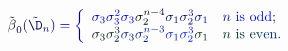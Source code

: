 \documentclass[12pt]{article}
\begin{document}
\makeatletter
\renewcommand*{\@textcolor}[3]{%
  \protect\leavevmode
  \begingroup
    \color#1{#2}#3%
  \endgroup
}
\makeatother
\begin{displaymath}
{\mathcolor[RGB]{0,0,15}{\tilde { \mathcolor[RGB]{0,0,30}{\beta} } }} _ { \mathcolor[RGB]{0,0,45}{0} } \mathcolor[RGB]{0,0,60}{(} {\mathcolor[RGB]{0,0,75}{\tilde { \mathcolor[RGB]{0,0,90}{\D} } }} _ { \mathcolor[RGB]{0,0,105}{n} } \mathcolor[RGB]{0,0,120}{)} \mathcolor[RGB]{0,0,135}{=} \mathcolor[RGB]{0,0,150}{\left\{} \begin{array} {ll} { \mathcolor[RGB]{0,0,165}{\sigma} _ { \mathcolor[RGB]{0,0,180}{3} } \mathcolor[RGB]{0,0,195}{\sigma} _ { \mathcolor[RGB]{0,0,210}{3} } ^ { \mathcolor[RGB]{0,0,225}{2} } \mathcolor[RGB]{0,0,240}{\sigma} _ { \mathcolor[RGB]{0,0,255}{3} } \mathcolor[RGB]{0,15,0}{\sigma} _ { \mathcolor[RGB]{0,15,15}{2} } ^ { \mathcolor[RGB]{0,15,30}{n} \mathcolor[RGB]{0,15,45}{-} \mathcolor[RGB]{0,15,60}{4} } \mathcolor[RGB]{0,15,75}{\sigma} _ { \mathcolor[RGB]{0,15,90}{1} } \mathcolor[RGB]{0,15,105}{\sigma} _ { \mathcolor[RGB]{0,15,120}{2} } ^ { \mathcolor[RGB]{0,15,135}{3} } \mathcolor[RGB]{0,15,150}{\sigma} _ { \mathcolor[RGB]{0,15,165}{1} } } & { \mathcolor[RGB]{0,15,180}{n} \mathrm { ~ \mathcolor[RGB]{0,15,195}{i} \mathcolor[RGB]{0,15,210}{s} ~ \mathcolor[RGB]{0,15,225}{o} \mathcolor[RGB]{0,15,240}{d} \mathcolor[RGB]{0,15,255}{d} } \mathcolor[RGB]{0,30,0}{;} } \\ { \mathcolor[RGB]{0,30,15}{\sigma} _ { \mathcolor[RGB]{0,30,30}{3} } \mathcolor[RGB]{0,30,45}{\sigma} _ { \mathcolor[RGB]{0,30,60}{2} } ^ { \mathcolor[RGB]{0,30,75}{3} } \mathcolor[RGB]{0,30,90}{\sigma} _ { \mathcolor[RGB]{0,30,105}{3} } \mathcolor[RGB]{0,30,120}{\sigma} _ { \mathcolor[RGB]{0,30,135}{2} } ^ { \mathcolor[RGB]{0,30,150}{n} \mathcolor[RGB]{0,30,165}{-} \mathcolor[RGB]{0,30,180}{3} } \mathcolor[RGB]{0,30,195}{\sigma} _ { \mathcolor[RGB]{0,30,210}{1} } \mathcolor[RGB]{0,30,225}{\sigma} _ { \mathcolor[RGB]{0,30,240}{2} } ^ { \mathcolor[RGB]{0,30,255}{3} } \mathcolor[RGB]{0,45,0}{\sigma} _ { \mathcolor[RGB]{0,45,15}{1} } } & { \mathcolor[RGB]{0,45,30}{n} \mathrm { ~ \mathcolor[RGB]{0,45,45}{i} \mathcolor[RGB]{0,45,60}{s} ~ \mathcolor[RGB]{0,45,75}{e} \mathcolor[RGB]{0,45,90}{v} \mathcolor[RGB]{0,45,105}{e} \mathcolor[RGB]{0,45,120}{n} } \mathcolor[RGB]{0,45,135}{.} } \end{array} \mathcolor[RGB]{0,45,150}{\right.}
\end{displaymath}
\end{document}
